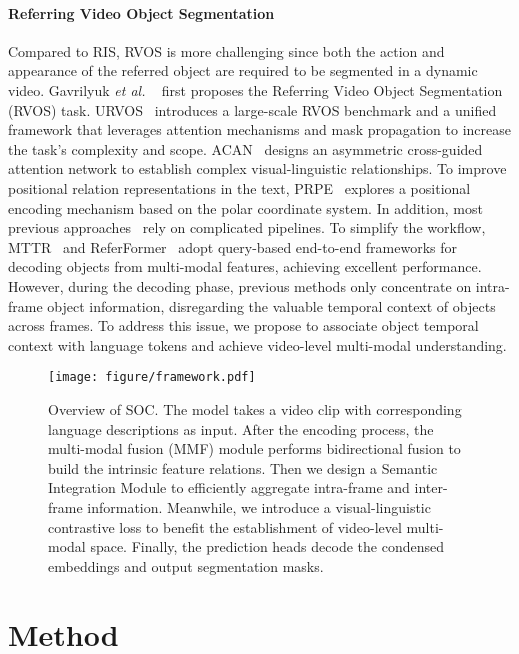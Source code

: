 \documentclass{article}
\begin{document}
\paragraph{Referring Video Object Segmentation}
Compared to RIS, RVOS is more challenging since both the action and appearance of the referred object are required to be segmented in a dynamic video. 
Gavrilyuk \textit{et al.} ~\cite{GavrilyukGLS18} first proposes the Referring Video Object Segmentation (RVOS) task. URVOS~\cite{urvos} introduces a large-scale RVOS benchmark and a unified framework that leverages attention mechanisms and mask propagation to increase the task's complexity and scope. ACAN~\cite{wang2019acan} designs an asymmetric cross-guided attention network to establish complex visual-linguistic relationships.
To improve positional relation representations in the text, PRPE~\cite{prpe} explores a positional encoding mechanism based on the polar coordinate system.
In addition, most previous approaches~\cite{liang2021clawcranenet, liu2022cmpc, rvos1, cmfsa, rvos2, vtcapsule} rely on complicated pipelines. To simplify the workflow, MTTR~\cite{mttr} and ReferFormer~\cite{referformer} adopt query-based end-to-end frameworks for decoding objects from multi-modal features, achieving excellent performance. However, during the decoding phase, previous methods only concentrate on intra-frame object information, disregarding the valuable temporal context of objects across frames. To address this issue, we propose to associate object temporal context with language tokens and achieve video-level multi-modal understanding. 

\begin{figure*}[t]
    \centering
    \texttt{[image: figure/framework.pdf]}
    \vspace{-15pt}
    \caption{Overview of SOC. The model takes a video clip with corresponding language descriptions as input. After the encoding process, the multi-modal fusion (MMF) module performs bidirectional fusion to build the intrinsic feature relations. Then we design a Semantic Integration Module to efficiently aggregate intra-frame and inter-frame information. Meanwhile, we introduce a visual-linguistic contrastive loss to benefit the establishment of video-level multi-modal space. Finally, the prediction heads decode the condensed embeddings and output segmentation masks.}
    \label{fig:framework}
    \vspace{-5pt}
\end{figure*}

\section{Method}
\end{document}
